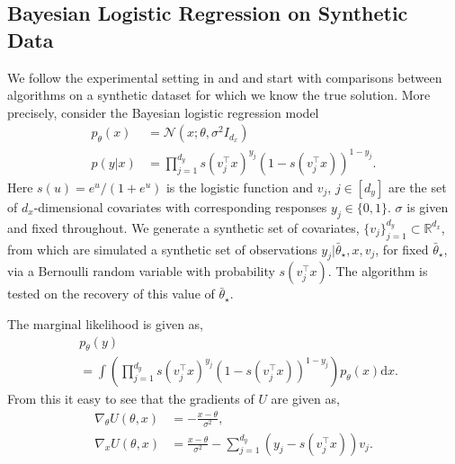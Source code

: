 \subsection{Bayesian Logistic Regression on Synthetic Data}\label{sec:toyex}
We follow the experimental setting in \citep{kuntz2023particle} and \citep{akyildiz2025interacting} and start with comparisons between algorithms on a synthetic dataset for which we know the true solution. More precisely, consider the Bayesian logistic regression model
\begin{align*}
p_\theta(x) &= \mathcal{N}(x; \theta, \sigma^2 I_{d_x})\\
p(y|x) &= \prod_{j=1}^{d_y} s(v_j^\intercal x)^{y_j} (1-s(v_j^\intercal x))^{1-y_j}.
\end{align*}
Here $s(u)=e^u/(1+e^u)$ is the logistic function and $v_j$, $j\in[d_y]$ are the set of $d_x$-dimensional covariates with corresponding responses $y_j\in\{0,1\}$. $\sigma$ is given and fixed throughout. We generate a synthetic set of covariates, $\{v_j\}_{j=1}^{d_y}\subset \mathbb{R}^{d_x}$, from which are simulated a synthetic set of observations $y_j|\bar{\theta}_\star, x, v_j$, for fixed $\bar{\theta}_\star$, via a Bernoulli random variable with probability $s(v_j^\intercal x)$. The algorithm is tested on the recovery of this value of $\bar{\theta}_\star$. 

The marginal likelihood is given as,
\begin{align*}
&p_\theta (y)\\
&= \int \left(\prod_{j=1}^{d_y} s(v_j^\intercal x)^{y_j} (1-s(v_j^\intercal x))^{1-y_j} \right) p_\theta(x)\mathrm{d}x.
\end{align*}
From this it easy to see that the gradients of $U$ are given as,
\begin{equation}\label{eq:logreggrad}
\begin{aligned}
 \nabla_\theta U(\theta, x) &= -\frac{x-\theta}{\sigma^2},\\
 \nabla_x U(\theta,x) &= \frac{x-\theta}{\sigma^2} - \sum_{j=1}^{d_y} (y_j - s(v_j^\intercal x))v_j.   
\end{aligned}
\end{equation}

